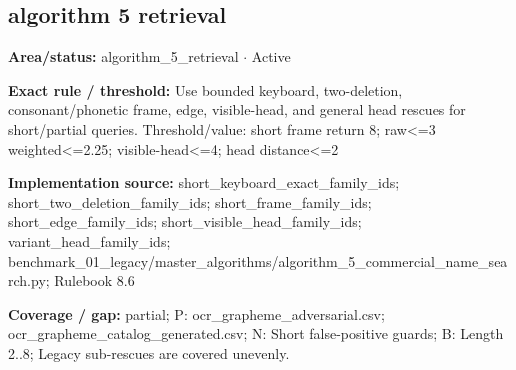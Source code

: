 \subsection*{algorithm 5 retrieval}
\begin{tcolorbox}[enhanced,breakable,colback=white,colframe=Muted!45,boxrule=0.45pt,arc=1.5pt,left=6pt,right=6pt,top=5pt,bottom=5pt,title={\texttt{A5-SHORT-RESCUE-07}},title after break={\texttt{A5-SHORT-RESCUE-07}\ (continued)},fonttitle=\headingfont\bfseries\color{Navy},coltitle=Navy]
\textbf{Area/status:} algorithm\_\allowbreak{}5\_\allowbreak{}retrieval $\boldsymbol{\cdot}$ Active\par
\smallskip
\textbf{Exact rule / threshold:} Use bounded keyboard, two-deletion, consonant/\allowbreak{}phonetic frame, edge, visible-head, and general head rescues for short/\allowbreak{}partial queries. Threshold/\allowbreak{}value: short frame return 8; raw<=3 weighted<=2.25; visible-head<=4; head distance<=2\par
\smallskip
\textbf{Implementation source:} short\_\allowbreak{}keyboard\_\allowbreak{}exact\_\allowbreak{}family\_\allowbreak{}ids; short\_\allowbreak{}two\_\allowbreak{}deletion\_\allowbreak{}family\_\allowbreak{}ids; short\_\allowbreak{}frame\_\allowbreak{}family\_\allowbreak{}ids; short\_\allowbreak{}edge\_\allowbreak{}family\_\allowbreak{}ids; short\_\allowbreak{}visible\_\allowbreak{}head\_\allowbreak{}family\_\allowbreak{}ids; variant\_\allowbreak{}head\_\allowbreak{}family\_\allowbreak{}ids; benchmark\_\allowbreak{}01\_\allowbreak{}legacy/\allowbreak{}master\_\allowbreak{}algorithms/\allowbreak{}algorithm\_\allowbreak{}5\_\allowbreak{}commercial\_\allowbreak{}name\_\allowbreak{}search.py; Rulebook 8.6\par
\smallskip
\textbf{Coverage / gap:} partial; P: ocr\_\allowbreak{}grapheme\_\allowbreak{}adversarial.csv; ocr\_\allowbreak{}grapheme\_\allowbreak{}catalog\_\allowbreak{}generated.csv; N: Short false-positive guards; B: Length 2..8; Legacy sub-rescues are covered unevenly.
\end{tcolorbox}
\medskip
